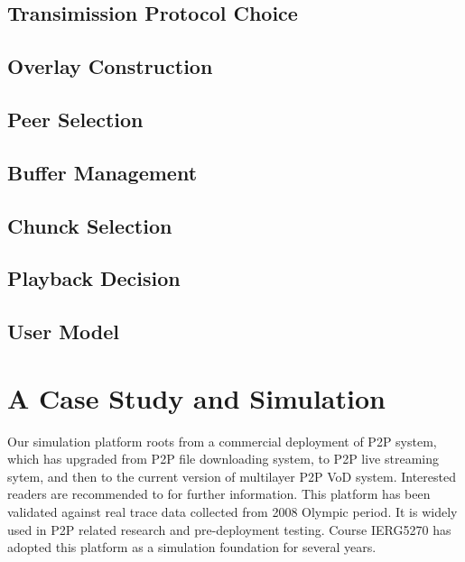 \documentclass[11pt,a4paper]{article}
\begin{document}
\subsection{Transimission Protocol Choice}


\subsection{Overlay Construction}


%


\subsection{Peer Selection}


\subsection{Buffer Management}


\subsection{Chunck Selection}

%



\subsection{Playback Decision}


\subsection{User Model}



\section{A Case Study and Simulation }
\label{sec:case}

Our simulation platform roots from a commercial deployment
of P2P system\cite{astri}, which has upgraded from P2P file downloading 
system, to P2P live streaming sytem, and then to the current 
version of multilayer P2P VoD system. Interested
readers are recommended to \cite{huang2010simulation} for 
further information. This platform has been validated against 
real trace data collected from 2008 Olympic period. It is 
widely used in P2P related research and pre-deployment testing. 
Course IERG5270\cite{ierg5270} has adopted this platform 
as a simulation foundation for several years. 
\end{document}
